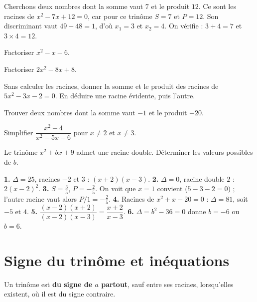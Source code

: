 \begin{exemple}
Cherchons deux nombres dont la somme vaut $7$ et le produit $12$. Ce sont les
racines de $x^{2}-7x+12 = 0$, car pour ce trinôme $S = 7$ et $P = 12$. Son
discriminant vaut $49-48 = 1$, d'où $x_{1} = 3$ et $x_{2} = 4$. On vérifie :
$3+4 = 7$ et $3\times4 = 12$.
\end{exemple}

\begin{entrainement}
\exo[\niveau{1}] Factoriser $x^{2}-x-6$.

\exo[\niveau{1}] Factoriser $2x^{2}-8x+8$.

\exo[\niveau{2}] Sans calculer les racines, donner la somme et le produit des
racines de $5x^{2}-3x-2 = 0$. En déduire une racine évidente, puis l'autre.

\exo[\niveau{2}] Trouver deux nombres dont la somme vaut $-1$ et le produit
$-20$.

\exo[\niveau{2}] Simplifier $\dfrac{x^{2}-4}{x^{2}-5x+6}$ pour $x \neq 2$ et
$x \neq 3$.

\exo[\niveau{3}] Le trinôme $x^{2}+bx+9$ admet une racine double. Déterminer
les valeurs possibles de $b$.
\end{entrainement}

\begin{corrige}
\textbf{1.} $\Delta = 25$, racines $-2$ et $3$ : $(x+2)(x-3)$.
\textbf{2.} $\Delta = 0$, racine double $2$ : $2(x-2)^{2}$.
\textbf{3.} $S = \frac35$, $P = -\frac25$. On voit que $x = 1$ convient
($5-3-2=0$) ; l'autre racine vaut alors $P/1 = -\frac25$.
\textbf{4.} Racines de $x^{2}+x-20 = 0$ : $\Delta = 81$, soit $-5$ et $4$.
\textbf{5.} $\dfrac{(x-2)(x+2)}{(x-2)(x-3)} = \dfrac{x+2}{x-3}$.
\textbf{6.} $\Delta = b^{2}-36 = 0$ donne $b = -6$ ou $b = 6$.
\end{corrige}

\section{Signe du trinôme et inéquations}

\begin{theoreme}
Un trinôme est \textbf{du signe de $a$ partout}, sauf entre ses racines,
lorsqu'elles existent, où il est du signe contraire.
\end{theoreme}

